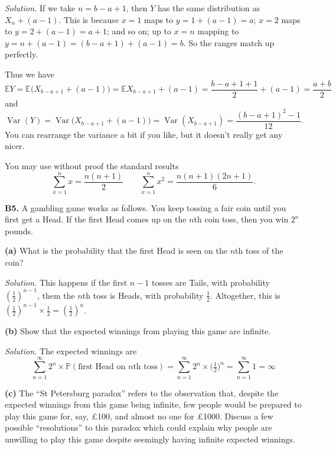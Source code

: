 \documentclass[
  a4paper,
]{book}
\theoremstyle{definition}
\theoremstyle{definition}
\theoremstyle{definition}
\theoremstyle{definition}
\theoremstyle{remark}
\begin{document}
\begin{myanswers}
\emph{Solution.} If we take \(n = b - a + 1\), then \(Y\) has the same distribution as \(X_n + (a-1)\). This is because \(x = 1\) maps to \(y = 1 + (a-1) = a\); \(x = 2\) maps to \(y = 2 + (a-1) = a+1\); and so on; up to \(x = n\) mapping to \(y = n + (a-1) = (b - a + 1) + (a-1) = b\). So the ranges match up perfectly.

Thus we have
\[ \mathbb EY = \mathbb E\big(X_{b-a+1} + (a-1)\big) = \mathbb EX_{b-a+1} + (a-1)= \frac{b - a + 1 +1}{2} + (a-1) = \frac{a + b}{2}  \]
and
\[ \operatorname{Var}(Y) = \operatorname{Var}\big(X_{b-a+1} + (a-1)\big) = \operatorname{Var}(X_{b-a+1}) = \frac{(b - a + 1)^2 - 1}{12} . \]
You can rearrange the variance a bit if you like, but it doesn't really get any nicer.

\end{myanswers}

You may use without proof the standard results
\[ \sum_{x=1}^n x = \frac{n(n+1)}{2} \qquad  \sum_{x=1}^n x^2 = \frac{n(n+1)(2n+1)}{6} . \]

\textbf{B5.} A gambling game works as follows. You keep tossing a fair coin until you first get a Head. If the first Head comes up on the \(n\)th coin toss, then you win \(2^n\) pounds.

\textbf{(a)} What is the probability that the first Head is seen on the \(n\)th toss of the coin?

\begin{myanswers}
\emph{Solution.}
This happens if the first \(n-1\) tosses are Tails, with probability \((\frac12)^{n-1}\), them the \(n\)th toss is Heads, with probability \(\frac12\). Altogether, this is \((\frac12)^{n-1}\times \frac12 = (\frac12)^n\).

\end{myanswers}

\textbf{(b)} Show that the expected winnings from playing this game are infinite.

\begin{myanswers}
\emph{Solution.}
The expected winnings are
\[ \sum_{n=1}^\infty 2^n \times \mathbb P(\text{first Head on $n$th toss}) = \sum_{n=1}^\infty 2^n \times \big(\tfrac12\big)^n = \sum_{n=1}^\infty 1 = \infty \]

\end{myanswers}

\textbf{(c)} The ``St Petersburg paradox'' refers to the observation that, despite the expected winnings from this game being infinite, few people would be prepared to play this game for, say, £100, and almost no one for £1000. Discuss a few possible ``resolutions'' to this paradox which could explain why people are unwilling to play this game despite seemingly having infinite expected winnings.
\end{document}

